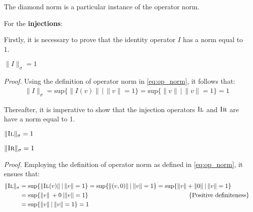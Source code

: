 The diamond norm is a particular instance of the operator norm. 
\vspace{15pt}

For the \textbf{injections}:

Firstly, it is necessary to prove that the identity operator $I$ has a norm equal to 1.
\begin{lemma} \label{lemid}
  $ \lVert I \rVert_{\sigma} = 1   $
\end{lemma}

\textit{Proof.} \quad Using the definition of operator norm in \autoref{eq:op_norm}, it follows that:
\begin{equation} 
\begin{split}
  \lVert I \rVert_{\sigma} = \text{sup} \{\lVert I (v) \rVert \hspace{2pt} \vert \hspace{2pt}  \lVert v\rVert =1 \} = \text{sup} \{\lVert v \rVert \hspace{2pt} \vert \hspace{2pt}  \lVert v\rVert =1 \} = 1
\end{split}
\end{equation}

\vspace{10pt}

Thereafter, it is imperative to show that the injection operators $\textsc{Il}$ and $\textsc{Ir}$ are have a norm equal to 1.

\begin{lemma} \label{lemil}
  $ \lVert \textsc{Il} \rVert_{\sigma} = 1   $
\end{lemma}

\begin{lemma} \label{lemir}
  $ \lVert \textsc{Ir} \rVert_{\sigma} = 1   $
\end{lemma} 

\textit{Proof.} \quad Employing the definition of operator norm as defined in \autoref{eq:op_norm}, it ensues that:
\begin{equation} 
\begin{split}
  \lVert \textsc{Il} \rVert_{\sigma} &= \text{sup} \{\lVert \textsc{Il} (v) \rVert \hspace{2pt} \vert \hspace{2pt}  \lVert v\rVert =1 \} = \text{sup} \{\lVert (v,0) \rVert \hspace{2pt} \vert \hspace{2pt}  \lVert v\rVert =1 \} = \text{sup} \{\lVert v \rVert + \lVert 0 \rVert  \hspace{2pt} \vert \hspace{2pt}  \lVert v\rVert =1 \} \\
  & = \text{sup} \{\lVert v \rVert \hspace{2pt} + 0    \hspace{2pt}  \vert \lVert v\rVert =1 \} \hspace{160 pt} \text{ \{Positive definiteness\}} \\
  & = \text{sup} \{\lVert v \rVert \hspace{2pt} \vert \hspace{2pt}  \lVert v\rVert =1 \} = 1
\end{split}
\end{equation}

